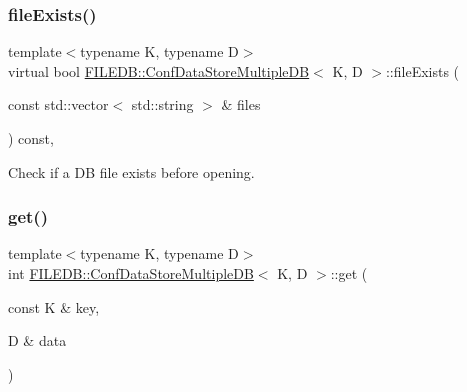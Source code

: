 \subsubsection{\texorpdfstring{fileExists()}{fileExists()}\hspace{0.1cm}{\footnotesize\ttfamily [2/2]}}
{\footnotesize\ttfamily template$<$typename K, typename D$>$ \\
virtual bool \mbox{\hyperlink{classFILEDB_1_1ConfDataStoreMultipleDB}{F\+I\+L\+E\+D\+B\+::\+Conf\+Data\+Store\+Multiple\+DB}}$<$ K, D $>$\+::file\+Exists (\begin{DoxyParamCaption}\item[{const std\+::vector$<$ std\+::string $>$ \&}]{files }\end{DoxyParamCaption}) const\hspace{0.3cm}{\ttfamily [inline]}, {\ttfamily [virtual]}}

Check if a DB file exists before opening. \mbox{\label{classFILEDB_1_1ConfDataStoreMultipleDB_a15c985c05120d6076e890f0507ceade7}} 
\subsubsection{\texorpdfstring{get()}{get()}\hspace{0.1cm}{\footnotesize\ttfamily [1/2]}}
{\footnotesize\ttfamily template$<$typename K, typename D$>$ \\
int \mbox{\hyperlink{classFILEDB_1_1ConfDataStoreMultipleDB}{F\+I\+L\+E\+D\+B\+::\+Conf\+Data\+Store\+Multiple\+DB}}$<$ K, D $>$\+::get (\begin{DoxyParamCaption}\item[{const K \&}]{key,  }\item[{D \&}]{data }\end{DoxyParamCaption})\hspace{0.3cm}{\ttfamily [inline]}}

